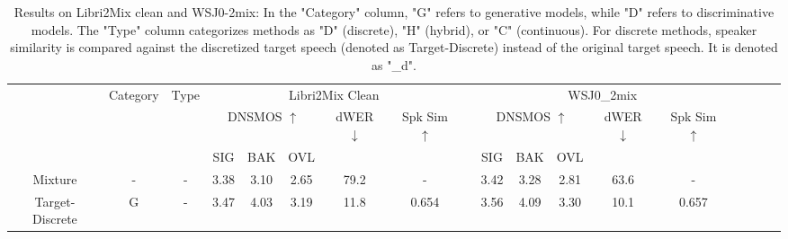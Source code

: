 \documentclass[conference]{IEEEtran}
\begin{document}
\begin{table}
  \caption{Results on Libri2Mix clean and WSJ0-2mix: In the "Category" column, "G" refers to generative models, while "D" refers to discriminative models. The "Type" column categorizes methods as "D" (discrete), "H" (hybrid), or "C" (continuous).
  For discrete methods, speaker similarity is compared against the discretized target speech (denoted as Target-Discrete) instead of the original target speech. It is denoted as "\_d".}
  \renewcommand{\arraystretch}{1.2}
  \begin{center}
    \setlength{\tabcolsep}{4.9pt}
  \begin{tabular}{cccccccccccccccccc}
    \Xhline{2\arrayrulewidth} %
  \multirow{3}{*}{System} & \multicolumn{1}{l}{\multirow{3}{*}{Category}} & \multicolumn{1}{l}{\multirow{3}{*}{Type}} &  \multicolumn{5}{c}{Libri2Mix Clean}                    &                               & \multicolumn{5}{c}{WSJ0\_2mix}                                                  \\
  \cline{4-8} \cline{10-14}
                          & \multicolumn{1}{l}{}                                                 & \multicolumn{1}{l}{}                            & \multicolumn{3}{c}{DNSMOS $\uparrow$} & dWER $\downarrow$ & Spk Sim $\uparrow$ &  & \multicolumn{3}{c}{DNSMOS $\uparrow$} & dWER $\downarrow$ & Spk Sim $\uparrow$  \\ \cline{4-6} \cline{10-12}
                          & \multicolumn{1}{l}{}                                                    & \multicolumn{1}{l}{}                            & SIG         & BAK        & OVL        &                   &        &             & SIG         & BAK        & OVL        &                   &                    \\ \hline
  Mixture                 & -                                             & -                                                                                           & 3.38        & 3.10       & 2.65       & 79.2            & -        &           & 3.42        & 3.28       & 2.81       & 63.6            & -                  \\
  Target-Discrete         & G                                             & -                                                                                          & 3.47       & 4.03       & 3.19       & 11.8            & 0.654     &          & 3.56        & 4.09       & 3.30       & 10.1            & 0.657               \\ \hline

\end{tabular}
\end{center}
\end{table}
\end{document}
